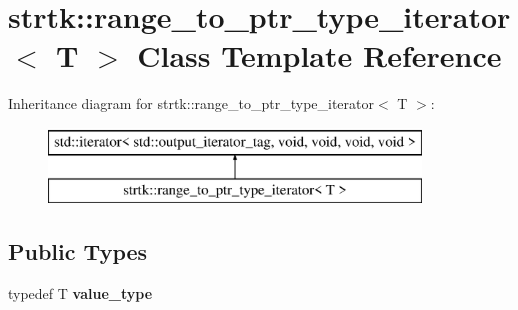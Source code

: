 \hypertarget{classstrtk_1_1range__to__ptr__type__iterator}{\section{strtk\-:\-:range\-\_\-to\-\_\-ptr\-\_\-type\-\_\-iterator$<$ T $>$ Class Template Reference}
\label{classstrtk_1_1range__to__ptr__type__iterator}
}
Inheritance diagram for strtk\-:\-:range\-\_\-to\-\_\-ptr\-\_\-type\-\_\-iterator$<$ T $>$\-:\begin{figure}[H]
\begin{center}
\leavevmode
\includegraphics[height=2.000000cm]{classstrtk_1_1range__to__ptr__type__iterator}
\end{center}
\end{figure}
\subsection*{Public Types}
\begin{DoxyCompactItemize}
\item 
\hypertarget{classstrtk_1_1range__to__ptr__type__iterator_a466df1043c4eb962c01e5acf97285a23}{typedef T {\bfseries value\-\_\-type}}\label{classstrtk_1_1range__to__ptr__type__iterator_a466df1043c4eb962c01e5acf97285a23}

\end{DoxyCompactItemize}

